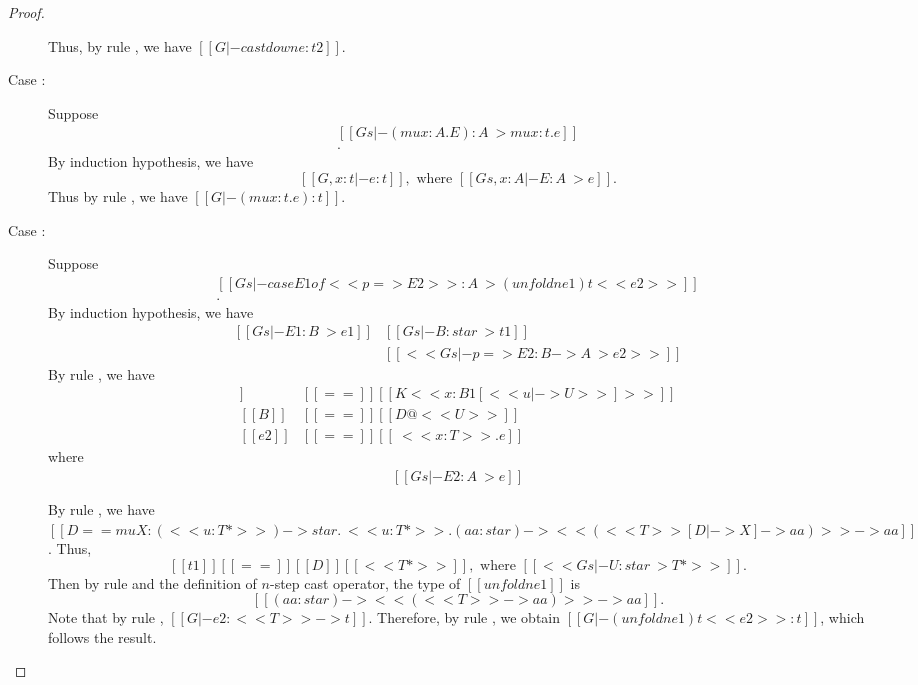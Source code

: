 \begin{proof}
\begin{description}
            Thus, by rule , we have $[[G |- castdown e : t2]]$.
        \item[Case \ruleref{TR\_Mu}:] Suppose 
                \[\begin{array}{l}
                    [[Gs |- (mu x:A . E):A ~> mu x:t.e]] \\
                    [[Gs |- A : star ~> t]]. 
                \end{array}\]
            By induction hypothesis, we have 
                \[ [[G, x : t |- e : t]],\text{ where }[[Gs, x:A |- E:A ~> e]]. \] 
            Thus by rule , we have $[[G |- (mu x:t.e) : t]]$.
        \item[Case \ruleref{TR\_Case}:] Suppose 
            \[\begin{array}{l}
                [[Gs |- case E1 of << p => E2>> : A ~> (unfoldn e1) t <<e2>>]] \\
                [[Gs |- A : star ~> t]].
            \end{array}\]
            By induction hypothesis, we have 
            \[\begin{array}{ll}
                [[Gs |- E1 : B ~> e1]] &
                [[Gs |- B : star ~> t1]] \\
                [[G |- e1 : t1]] &
                [[<< Gs |- p => E2 : B -> A~> e2 >>]]            
            \end{array}\]
            By rule , we have
            \begin{align*}
                [[p]] &[[==]] [[K <<x:B1[<< u |-> U >>]>>]] \\
                [[B]] &[[==]] [[D@<<U>>]] \\
                [[e2]] &[[==]] [[\ <<x:T>> .e]]
            \end{align*}
            where
            \[\begin{array}{l}
                [[Gs |- E2 : A ~> e]] \\
                [[G |- e : t]] \\
                [[Gs |- B1[<< u |-> U >>]:star ~> T ]]
            \end{array}\]
            By rule , we have $[[D == mu X : (<<u:T*>>) ->
            star . \ <<u:T*>> . (aa:star) -> << (<<T>>[D |-> X] -> aa) >> -> aa]]$. Thus,
            \[ [[t1]] [[==]] [[D]] [[<<T*>>]],\text{ where }[[<<Gs |- U : star ~> T*>>]].\] Then by
            rule  and the definition of $n$-step cast operator, the
            type of $[[unfoldn e1]]$ is \[ [[(aa:star) -> << (<<T>> -> aa) >> -> aa]].\] Note
            that by rule , $[[G |- e2 : <<T>> -> t]]$. Therefore, by rule
            , we obtain $[[G |- (unfoldn e1) t <<e2>> : t]]$, which follows
            the result.
    \end{description}
\end{proof}

